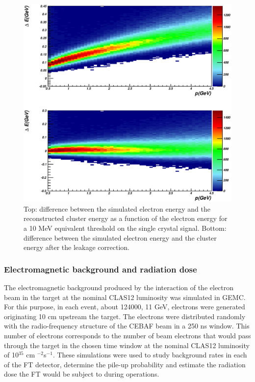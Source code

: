 \begin{figure}
\includegraphics[height=\columnwidth]{fig/gemc_leakage.eps}
\caption{Top: difference between the simulated
electron energy and the reconstructed cluster
energy as a function of the electron energy
for a 10 MeV equivalent threshold on the single
crystal signal. Bottom: difference between the
simulated electron energy and the cluster energy
after the leakage correction.}
\label{fig:gemc_leakage}
\end{figure}



\subsubsection{Electromagnetic background and radiation dose}
The electromagnetic background produced by the interaction of the electron beam in the target  at the nominal CLAS12 luminosity was simulated in GEMC. For this purpose, in each event, about 124000, 11 GeV, electrons were generated originating 10 cm upstream the target. The electrons were distributed randomly with the radio-frequency structure of the CEBAF beam in a 250 ns window. This number of electrons corresponds to the number of beam electrons that would pass through the target in the chosen time window at the nominal CLAS12 luminosity of 10$^{35}$ cm $^{-2}$s$^{-1}$.
These simulations were used to study background rates in each of the FT detector, determine the pile-up probability and estimate the radiation dose the FT would be subject to during operations.

